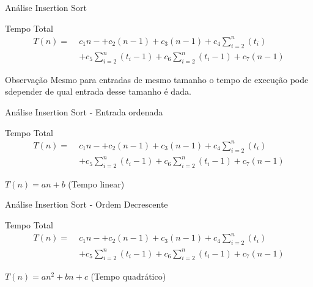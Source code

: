 \documentclass{beamer}
\newcommand{\og}[1]{\textcolor{rsOrange}{#1}}
\begin{document}
\begin{frame}{Análise Insertion Sort}


\begin{block}{Tempo Total}
\small
\begin{align*}
T(n) =\;& c_1 n- + c_2 (n-1) + c_3 (n-1) + c_4 \sum_{i=2}^{n} (t_i)\\
       & + c_5 \sum_{i=2}^{n} (t_i - 1) + c_6 \sum_{i=2}^{n} (t_i - 1) + c_7(n-1)
\end{align*}
\normalsize
\end{block}

\vspace{0.3cm}

\vspace{0.3cm}

\begin{alertblock}{Observação}
Mesmo para entradas de mesmo tamanho o tempo de execução pode sdepender de qual entrada desse tamanho é dada.
\end{alertblock}

\end{frame}
\begin{frame}{Análise Insertion Sort - Entrada ordenada}

\begin{block}{Tempo Total}
\small
\begin{align*}
T(n) =\;& c_1 n- + c_2 (n-1) + c_3 (n-1) + c_4 \sum_{i=2}^{n} (t_i)\\
       & + c_5 \sum_{i=2}^{n} (t_i - 1) + c_6 \sum_{i=2}^{n} (t_i - 1) + c_7(n-1)
\end{align*}
\normalsize
\end{block}


\og{$T(n) = an + b$ (Tempo linear)}

\end{frame}
\begin{frame}{Análise Insertion Sort - Ordem Decrescente}

\begin{block}{Tempo Total}
\small
\begin{align*}
T(n) =\;& c_1 n- + c_2 (n-1) + c_3 (n-1) + c_4 \sum_{i=2}^{n} (t_i)\\
       & + c_5 \sum_{i=2}^{n} (t_i - 1) + c_6 \sum_{i=2}^{n} (t_i - 1) + c_7(n-1)
\end{align*}
\normalsize
\end{block}

\og{$T(n) = an^2 + bn + c$ (Tempo quadrático)}

\end{frame}
\end{document}
